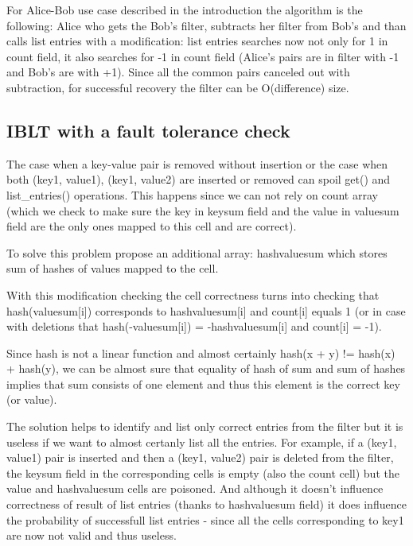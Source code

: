 \documentclass{article}
\begin{document}
For Alice-Bob use case described in the introduction the algorithm is the
following: Alice who gets the Bob's filter, subtracts her filter from Bob's and
than calls list entries with a modification: list entries searches now not only 
for 1 in count field, it also searches for -1 in count field (Alice's pairs are 
in filter with -1 and Bob's are with +1). Since all the common pairs canceled
out with subtraction, for successful recovery the filter can be O(difference) size. 

\subsection{IBLT with a fault tolerance check}

The case when a key-value pair is removed without insertion or the case when 
both (key1, value1), (key1, value2) are inserted or removed can spoil get() and 
list\_entries() operations. This happens since we can not rely on count array 
(which we check to make sure the key in keysum field and the value in valuesum 
field are the only ones mapped to this cell and are correct).

To solve this problem \textcite{GoMi2011} propose an additional array: 
hashvaluesum which stores sum of hashes of values mapped to the cell.

With this modification checking the cell correctness turns into checking 
that hash(valuesum[i]) corresponds to hashvaluesum[i] and count[i] equals 1 (or
in case with deletions that hash(-valuesum[i]) = -hashvaluesum[i] and count[i] =
-1).

Since hash is not a linear function and almost certainly hash(x + y) != hash(x)
+ hash(y), we can be almost sure that equality of hash of sum and sum of hashes implies 
that sum consists of one element and thus this element is the correct key (or value).

The solution helps to identify and list only correct entries from the filter 
but it is useless if we want to almost certanly list all the entries. For example,
if a (key1, value1) pair is inserted and then a (key1, value2) pair is deleted 
from the filter, the keysum field in the corresponding cells is empty (also the 
count cell) but the value and hashvaluesum cells are poisoned. And although it
doesn't influence correctness of result of list entries (thanks to hashvaluesum
field) it does influence the probability of successfull list entries - since 
all the cells corresponding to key1 are now not valid and thus useless.
\end{document}
